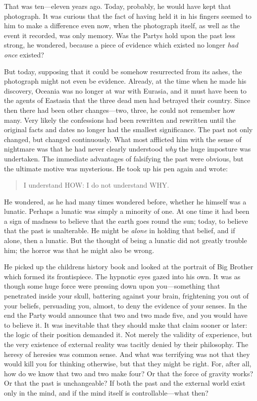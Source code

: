 That was ten---eleven years ago. Today, probably, he would have kept
that photograph. It was curious that the fact of having held it in his
fingers seemed to him to make a difference even now, when the photograph
itself, as well as the event it recorded, was only memory. Was the
Party\textquotesingle s hold upon the past less strong, he wondered,
because a piece of evidence which existed no longer \emph{had once}
existed?

But today, supposing that it could be somehow resurrected from its
ashes, the photograph might not even be evidence. Already, at the time
when he made his discovery, Oceania was no longer at war with Eurasia,
and it must have been to the agents of Eastasia that the three dead men
had betrayed their country. Since then there had been other
changes---two, three, he could not remember how many. Very likely the
confessions had been rewritten and rewritten until the original facts
and dates no longer had the smallest significance. The past not only
changed, but changed continuously. What most afflicted him with the
sense of nightmare was that he had never clearly understood \emph{why}
the huge imposture was undertaken. The immediate advantages of
falsifying the past were obvious, but the ultimate motive was
mysterious. He took up his pen again and wrote:

\begin{quotation}
I understand HOW: I do not understand WHY.
\end{quotation}

He wondered, as he had many times wondered before, whether he himself
was a lunatic. Perhaps a lunatic was simply a minority of one. At one
time it had been a sign of madness to believe that the earth goes round
the sun; today, to believe that the past is unalterable. He might be
\emph{alone} in holding that belief, and if alone, then a lunatic. But
the thought of being a lunatic did not greatly trouble him; the horror
was that he might also be wrong.

He picked up the children\textquotesingle s history book and looked at
the portrait of Big Brother which formed its frontispiece. The hypnotic
eyes gazed into his own. It was as though some huge force were pressing
down upon you---something that penetrated inside your skull, battering
against your brain, frightening you out of your beliefs, persuading you,
almost, to deny the evidence of your senses. In the end the Party would
announce that two and two made five, and you would have to believe it.
It was inevitable that they should make that claim sooner or later: the
logic of their position demanded it. Not merely the validity of
experience, but the very existence of external reality was tacitly
denied by their philosophy. The heresy of heresies was common sense. And
what was terrifying was not that they would kill you for thinking
otherwise, but that they might be right. For, after all, how do we know
that two and two make four? Or that the force of gravity works? Or that
the past is unchangeable? If both the past and the external world exist
only in the mind, and if the mind itself is controllable---what then?

